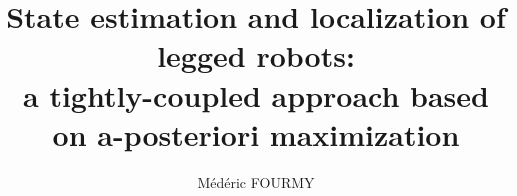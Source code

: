 %
%
%
% 
%

\usepackage[ED=EDSYS-Robo, Ets=INSA]{tlsflyleaf}
\title{\textbf{\large State estimation and localization of legged robots: \\ a tightly-coupled approach based on a-posteriori maximization}}
\author{Médéric FOURMY}

